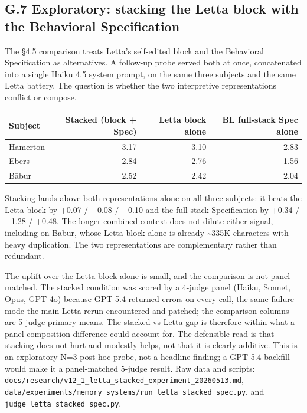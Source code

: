 \hypertarget{g.7-exploratory-stacking-the-letta-block-with-the-behavioral-specification}{%
\subsection{G.7 Exploratory: stacking the Letta block with the
Behavioral
Specification}\label{g.7-exploratory-stacking-the-letta-block-with-the-behavioral-specification}}

The \hyperref[exploratory-case-study-letta-stateful-agent-n3-post-hoc]{§4.5} comparison treats Letta's self-edited block and the Behavioral
Specification as alternatives. A follow-up probe served both at once,
concatenated into a single Haiku 4.5 system prompt, on the same three
subjects and the same Letta battery. The question is whether the two
interpretive representations conflict or compose.

\begin{longtable}[]{@{}lrrr@{}}
\toprule
Subject & Stacked (block + Spec) & Letta block alone & BL full-stack
Spec alone \\
\midrule
\endhead
Hamerton & 3.17 & 3.10 & 2.83 \\
Ebers & 2.84 & 2.76 & 1.56 \\
Bābur & 2.52 & 2.42 & 2.04 \\
\bottomrule
\end{longtable}

Stacking lands above both representations alone on all three subjects:
it beats the Letta block by +0.07 / +0.08 / +0.10 and the full-stack
Specification by +0.34 / +1.28 / +0.48. The longer combined context does
not dilute either signal, including on Bābur, whose Letta block alone is
already \textasciitilde335K characters with heavy duplication. The two
representations are complementary rather than redundant.

The uplift over the Letta block alone is small, and the comparison is
not panel-matched. The stacked condition was scored by a 4-judge panel
(Haiku, Sonnet, Opus, GPT-4o) because GPT-5.4 returned errors on every
call, the same failure mode the main Letta rerun encountered and
patched; the comparison columns are 5-judge primary means. The
stacked-vs-Letta gap is therefore within what a panel-composition
difference could account for. The defensible read is that stacking does
not hurt and modestly helps, not that it is clearly additive. This is an
exploratory N=3 post-hoc probe, not a headline finding; a GPT-5.4
backfill would make it a panel-matched 5-judge result. Raw data and
scripts:
\texttt{docs/research/v12\_1\_letta\_stacked\_experiment\_20260513.md},
\texttt{data/experiments/memory\_systems/run\_letta\_stacked\_spec.py},
and \texttt{judge\_letta\_stacked\_spec.py}.

